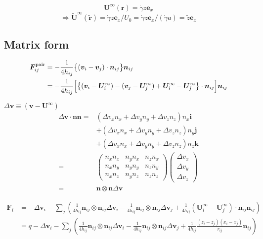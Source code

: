 \documentclass[12pt]{article}
\begin{document}
\begin{equation}
 \bm{U}^{\infty}(\bm{r})
 = 
 \dot{\gamma} z \bm{e}_{x}
\end{equation}
\begin{equation}
\Longrightarrow
  \tilde{\bm{U}}^{\infty}(\tilde{\bm{r}})
 = 
 \dot{\gamma} z \bm{e}_{x} / U_0
=  \dot{\gamma} z \bm{e}_{x} / (\dot{\gamma} a)
= \tilde{z} \bm{e}_{x} 
\end{equation}


\newpage
\subsection*{Matrix form}
\begin{align}
 \bm{F}_{ij}^{\mathrm{pair}}
&= 
- \frac{1}{4 h_{ij}}
\bigl\{
(\bm{v}_i-
\bm{v}_j)\cdot
\bm{n}_{ij}
\bigr\}\bm{n}_{ij} \\
&=
- \frac{1}{4 h_{ij}}
\Bigl[
\bigl\{
(\bm{v}_i- \bm{U}^{\infty}_i)-
(\bm{v}_j- \bm{U}^{\infty}_j)
+ \bm{U}^{\infty}_i 
- \bm{U}^{\infty}_j
\bigr\}\cdot
\bm{n}_{ij}
\Bigr]
\bm{n}_{ij}
\end{align}

$\Delta \bm{v} \equiv (\bm{v}- \bm{U}^{\infty})$
\begin{align}
\Delta \bm{v} \cdot
\bm{n} \bm{n}
= &
(\Delta v_x n_x 
+\Delta v_y n_y
+\Delta v_z n_z) n_x \bm{i}\\
& 
+ (\Delta v_x n_x 
+\Delta v_y n_y
+\Delta v_z n_z) n_y \bm{j}\\
&
+ (\Delta v_x n_x 
+\Delta v_y n_y
+\Delta v_z n_z) n_z \bm{k} \\
=&
\begin{pmatrix}
 n_x n_x &   n_y n_x &   n_z n_x \\
 n_x n_y &   n_y n_y &   n_z n_y \\
 n_x n_z &   n_y n_z &   n_z n_z 
\end{pmatrix}
\begin{pmatrix}
 \Delta v_x \\
 \Delta v_y \\
 \Delta v_z 
\end{pmatrix} 
\\
=&\bm{n} \otimes \bm{n} \Delta \bm{v}
\end{align}

\begin{align}
  \bm{F}_i  &= 
  -  \Delta \bm{v}_i 
  - \sum_j
  \left(
    \frac{1}{4h_{ij}} \bm{n}_{ij} \otimes \bm{n}_{ij} \Delta \bm{v}_i
    - \frac{1}{4h_{ij}} \bm{n}_{ij} \otimes \bm{n}_{ij} \Delta \bm{v}_j 
    + \frac{1}{4h_{ij}}  
    (\bm{U}_i^{\infty} -\bm{U}_j^{\infty} 
    ) \cdot \bm{n}_{ij}\bm{n}_{ij} 
  \right) \\
  &=
  q -  \Delta \bm{v}_i 
  - \sum_j
  \left(
    \frac{1}{4h_{ij}} \bm{n}_{ij} \otimes \bm{n}_{ij} \Delta \bm{v}_i
    - \frac{1}{4h_{ij}} \bm{n}_{ij} \otimes \bm{n}_{ij} \Delta \bm{v}_j
    + \frac{1}{4h_{ij}}
    \frac{(z_i - z_j )(x_i-x_j)}{r_{ij}} \bm{n}_{ij} \right)
  \end{align}
\end{document}
